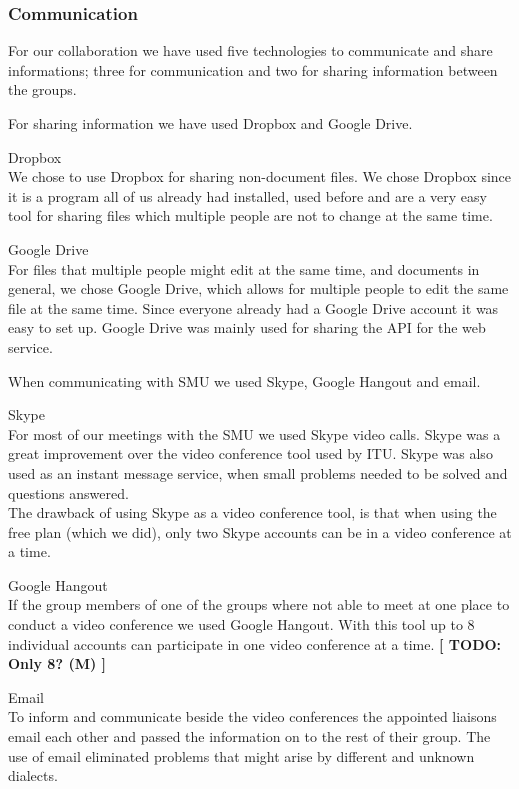 \subsubsection{Communication}
For our collaboration we have used five technologies to communicate and share informations; three for communication and two for sharing information between the groups.

For sharing information we have used Dropbox and Google Drive. \vspace{-5mm}
\begin{description}
	\item Dropbox \\
		We chose to use Dropbox for sharing non-document files. We chose Dropbox since it is a program all of us already had installed, used before and are a very easy tool for sharing files which multiple people are not to change at the same time.
	\item Google Drive \\
		For files that multiple people might edit at the same time, and documents in general, we chose Google Drive, which allows for multiple people to edit the same file at the same time. Since everyone already had a Google Drive account it was easy to set up.
		Google Drive was mainly used for sharing the API for the web service.
\end{description}

When communicating with SMU we used Skype, Google Hangout and email.
\vspace{-5mm}
\begin{description}
	\item Skype \\
		For most of our meetings with the SMU we used Skype video calls. Skype was a great improvement over the video conference tool used by ITU.
		Skype was also used as an instant message service, when small problems needed to be solved and questions answered. \\
		The drawback of using Skype as a video conference tool, is that when using the free plan (which we did), only two Skype accounts can be in a video conference at a time.
	\item Google Hangout \\
		If the group members of one of the groups where not able to meet at one place to conduct a video conference we used Google Hangout. With this tool up to 8 individual accounts can participate in one video conference at a time. \textbf{[ TODO: Only 8? (M) ]}
	\item Email \\
		To inform and communicate beside the video conferences the appointed liaisons email each other and passed the information on to the rest of their group.
		The use of email eliminated problems that might arise by different and unknown dialects.
\end{description}
